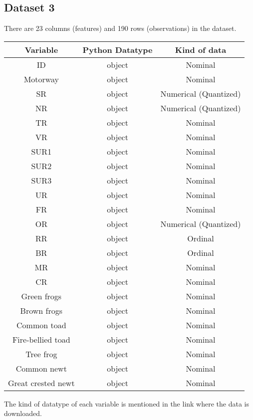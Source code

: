 \documentclass[12pt]{article}
\begin{document}
\subsection*{Dataset 3}
There are 23 columns (features) and 190 rows (observations) in the dataset.
\begin{center}
    \begin{tabular}{ |c|c|c|}
    \hline
    Variable & Python Datatype & Kind of data \\
    \hline
    ID                   & object & Nominal\\
    Motorway             & object & Nominal\\
    SR                   & object & Numerical (Quantized)\\
    NR                   & object & Numerical (Quantized)\\
    TR                   & object & Nominal\\
    VR                   & object & Nominal\\
    SUR1                 & object & Nominal\\
    SUR2                 & object & Nominal\\
    SUR3                 & object & Nominal\\
    UR                   & object & Nominal\\
    FR                   & object & Nominal\\    
    OR                   & object & Numerical (Quantized)\\
    RR                   & object & Ordinal\\
    BR                   & object & Ordinal\\
    MR                   & object & Nominal\\
    CR                   & object & Nominal\\
    Green frogs          & object & Nominal\\
    Brown frogs          & object & Nominal\\
    Common toad          & object & Nominal\\
    Fire-bellied toad    & object & Nominal\\
    Tree frog            & object & Nominal\\
    Common newt          & object & Nominal\\
    Great crested newt   & object & Nominal\\

    \hline
    \end{tabular}
\end{center}
The kind of datatype of each variable is mentioned in the link where the data is downloaded.
\end{document}
